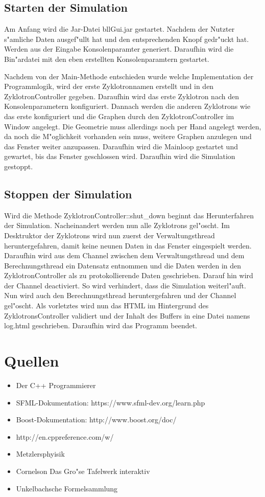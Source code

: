 \documentclass[14pt, a4paper]{report}
\begin{document}
\section{Starten der Simulation}
Am Anfang wird die Jar-Datei bllGui.jar gestartet. Nachdem der Nutzter s"amliche Daten
ausgef"ullt hat und den entsprechenden Knopf gedr"uckt hat. Werden aus der Eingabe 
Konsolenparamter generiert. Daraufhin wird die Bin"ardatei mit den eben erstellten
Konsolenparamtern gestartet.

Nachdem von der Main-Methode entschieden wurde welche Implementation der Programmlogik,
wird der erste Zyklotronnamen erstellt und in den ZyklotronController gegeben. Daraufhin
wird das erste Zyklotron nach den Konsolenparametern konfiguriert. Dannach werden die
anderen Zyklotrons wie das erste konfiguriert und die Graphen durch den
ZyklotronController im Window angelegt. Die Geometrie muss allerdings noch per Hand 
angelegt werden, da noch die M"oglichkeit vorhanden sein muss, weitere Graphen anzulegen
und das Fenster weiter anzupassen. Daraufhin wird die Mainloop gestartet und gewartet,
bis das Fenster geschlossen wird. Daraufhin wird die Simulation gestoppt.

\section{Stoppen der Simulation}
Wird die Methode ZyklotronController::shut\_down beginnt das Herunterfahren der 
Simulation. Nacheinandert werden nun alle Zyklotrons gel"oscht. Im Desktruktor der 
Zyklotrons wird nun zuerst der Verwaltungsthread heruntergefahren, damit keine neunen
Daten in das Fenster eingespielt werden. Daraufhin wird aus dem Channel zwischen dem 
Verwaltungsthread und dem Berechnungsthread ein Datensatz entnommen und die Daten werden
in den ZyklotronController als zu protokollierende Daten geschrieben. Darauf hin wird
der Channel deactiviert. So wird verhindert, dass die Simulation weiterl"auft. Nun wird
auch den Berechnungsthread heruntergefahren und der Channel gel"oscht. Als vorletztes
wird nun das HTML im Hintergrund des ZyklotronsController validiert und der Inhalt des
Buffers in eine Datei namens log.html geschrieben. Daraufhin wird das Programm beendet.

\chapter{Quellen}
\begin{itemize}

\item Der C++ Programmierer
\item SFML-Dokumentation: https://www.sfml-dev.org/learn.php 
\item Boost-Dokumentation: http://www.boost.org/doc/
\item http://en.cppreference.com/w/
\item Metzlersphyisik
\item Cornelson Das Gro"se Tafelwerk interaktiv
\item Unkelbachsche Formelsammlung

\end{itemize}
\end{document}
